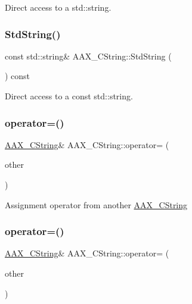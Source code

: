 Direct access to a std\+::string. \mbox{\label{a01573_aa620aa582f7a5eda1c6559f0869dce6f}} 
\subsubsection{\texorpdfstring{StdString()}{StdString()}\hspace{0.1cm}{\footnotesize\ttfamily [2/2]}}
{\footnotesize\ttfamily const std\+::string\& A\+A\+X\+\_\+\+C\+String\+::\+Std\+String (\begin{DoxyParamCaption}{ }\end{DoxyParamCaption}) const}

Direct access to a const std\+::string. \mbox{\label{a01573_ae62cc4543c9ac4d8682176474c46d8d2}} 
\subsubsection{\texorpdfstring{operator=()}{operator=()}\hspace{0.1cm}{\footnotesize\ttfamily [3/5]}}
{\footnotesize\ttfamily \mbox{\hyperlink{a01573}{A\+A\+X\+\_\+\+C\+String}}\& A\+A\+X\+\_\+\+C\+String\+::operator= (\begin{DoxyParamCaption}\item[{const \mbox{\hyperlink{a01573}{A\+A\+X\+\_\+\+C\+String}} \&}]{other }\end{DoxyParamCaption})}

Assignment operator from another \mbox{\hyperlink{a01573}{A\+A\+X\+\_\+\+C\+String}} \mbox{\label{a01573_ad6db6f32c710ef0897ca09cb8ff9f3be}} 
\subsubsection{\texorpdfstring{operator=()}{operator=()}\hspace{0.1cm}{\footnotesize\ttfamily [4/5]}}
{\footnotesize\ttfamily \mbox{\hyperlink{a01573}{A\+A\+X\+\_\+\+C\+String}}\& A\+A\+X\+\_\+\+C\+String\+::operator= (\begin{DoxyParamCaption}\item[{const std\+::string \&}]{other }\end{DoxyParamCaption})}

